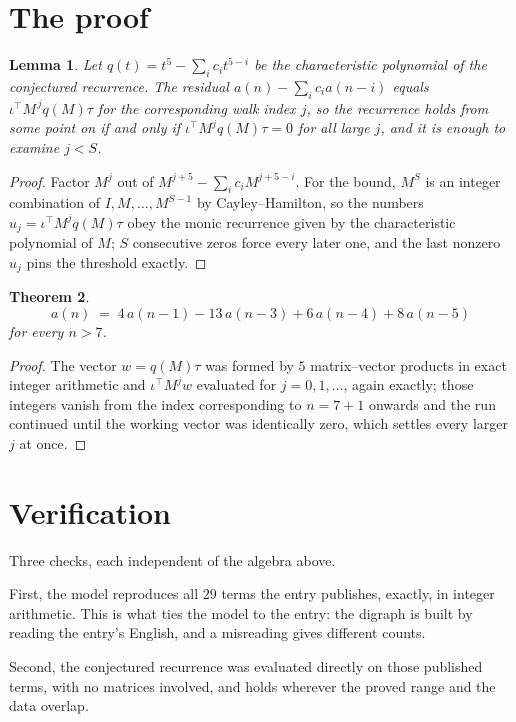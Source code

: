 \documentclass[11pt,a4paper]{article}
\theoremstyle{plain}
\newtheorem{theorem}{Theorem}
\newtheorem{lemma}[theorem]{Lemma}
\theoremstyle{definition}
\begin{document}
\section{The proof}

\begin{lemma}\label{lem:crit}
Let $q(t)=t^{5}-\sum_i c_it^{5-i}$ be the characteristic polynomial of the
conjectured recurrence. The residual $a(n)-\sum_ic_ia(n-i)$ equals
$\iota^{\!\top}M^{\,j}q(M)\tau$ for the corresponding walk index $j$, so the recurrence
holds from some point on if and only if $\iota^{\!\top}M^{j}q(M)\tau=0$ for all large $j$,
and it is enough to examine $j<S$.
\end{lemma}

\begin{proof}
Factor $M^{j}$ out of $M^{j+5}-\sum_ic_iM^{j+5-i}$. For the bound, $M^{S}$
is an integer combination of $I,M,\dots,M^{S-1}$ by Cayley--Hamilton, so the numbers
$u_j=\iota^{\!\top}M^{j}q(M)\tau$ obey the monic recurrence given by the characteristic
polynomial of $M$; $S$ consecutive zeros force every later one, and the last nonzero $u_j$
pins the threshold exactly.
\end{proof}

\begin{theorem}
\[
a(n)\;=\;4\,a(n-1) - 13\,a(n-3) + 6\,a(n-4) + 8\,a(n-5)
\]
for every $n>7$.
\end{theorem}

\begin{proof}
The vector $w=q(M)\tau$ was formed by $5$ matrix--vector products in exact integer
arithmetic and $\iota^{\!\top}M^{j}w$ evaluated for $j=0,1,\dots$, again exactly; those
integers vanish from the index corresponding to $n=7+1$ onwards and the run continued
until the working vector was identically zero, which settles every larger $j$ at once.
\end{proof}

\section{Verification}

Three checks, each independent of the algebra above.

First, the model reproduces all $29$ terms the entry publishes, exactly, in integer
arithmetic. This is what ties the model to the entry: the digraph is built by reading the
entry's English, and a misreading gives different counts.

Second, the conjectured recurrence was evaluated directly on those published terms, with no
matrices involved, and holds wherever the proved range and the data overlap.
\end{document}
